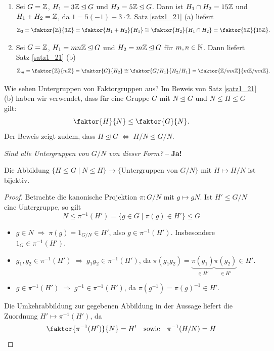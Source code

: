 \begin{beispiel}
	\begin{enumerate}[label=(\arabic*)]
		\item Sei $G = \mathbb{Z}$, $H_1 = 3\mathbb{Z} \unlhd G$ und $H_2 = 5\mathbb{Z} \unlhd G$. Dann ist $H_1 \cap H_2 = 15\mathbb{Z}$ und $H_1 + H_2 = \mathbb{Z}$, da $1 = 5(-1) + 3 \cdot 2.$ Satz \ref{satz1_21} (a) liefert
		\[\Z_3 = \faktor{\Z}{3\Z} = \faktor{H_1 + H_2}{H_1} \cong \faktor{H_2}{H_1 \cap H_2} = \faktor{5\Z}{15\Z}.\]
		\item Sei $G = \mathbb{Z}$, $H_1 = mn\mathbb{Z} \unlhd G$ und $H_2 = m\mathbb{Z} \unlhd G$ für $m,n \in \mathbb{N}$. Dann liefert Satz \ref{satz1_21} (b)
		\[\Z_m = \faktor{\Z}{m\Z} = \faktor{G}{H_2} \cong \faktor{G/H_1}{H_2/H_1} = \faktor{\Z/mn\Z}{m\Z/mn\Z}.\]
 	\end{enumerate}
\end{beispiel}

Wie sehen Untergruppen von Faktorgruppen aus? Im Beweis von Satz \ref{satz1_21} (b) haben wir verwendet, dass für eine Gruppe $G$ mit $N \unlhd G$ und $N \leq H \leq G$ gilt:
\[\faktor{H}{N} \leq \faktor{G}{N}.\]
Der Beweis zeigt zudem, dass $H \unlhd G \;\Leftrightarrow\; H/N \unlhd G/N$. 

\begin{center}
	\Large{\textit{Sind alle Untergruppen von $G/N$ von dieser Form?} -- \textbf{Ja!}}
\end{center}

\begin{satz}\label{satz1_23}
	Die Abbildung $\{H \leq G \mid N \leq H\} \to \{\text{Untergruppen von } G/N\}$ mit $H \mapsto H/N$ ist bijektiv.
\end{satz}
\begin{proof}
	Betrachte die kanonische Projektion $\pi \colon G/N$ mit $g \mapsto gN$. Ist $H' \leq G/N$ eine Untergruppe, so gilt 
	\[N \leq \pi^{-1}(H') = \{g \in G \mid \pi(g) \in H'\} \leq G\]
	\begin{itemize}
		\item $g \in N \;\Rightarrow\; \pi(g) = 1_{G/N} \in H'$, also $g \in \pi^{-1}(H')$. Insbesondere $1_G \in \pi^{-1}(H')$.
		\item $g_1, g_2 \in \pi^{-1}(H') \;\Rightarrow\; g_1g_2 \in \pi^{-1}(H')$, da $\pi(g_1g_2) = \underbrace{\pi(g_1)}_{\in H'}\underbrace{\pi(g_2)}_{\in H'} \in H'$.
		\item $g \in \pi^{-1}(H') \;\Rightarrow\; g^{-1} \in \pi^{-1}(H')$, da $\pi(g^{-1}) = \pi(g)^{-1} \in H'$.
	\end{itemize}
	Die Umkehrabbildung zur gegebenen Abbildung in der Aussage liefert die Zuordnung $H' \mapsto \pi^{-1}(H')$, da 
	\[\faktor{\pi^{-1}(H')}{N} = H' \quad\text{sowie}\quad \pi^{-1}(H/N) = H\]
\end{proof}

